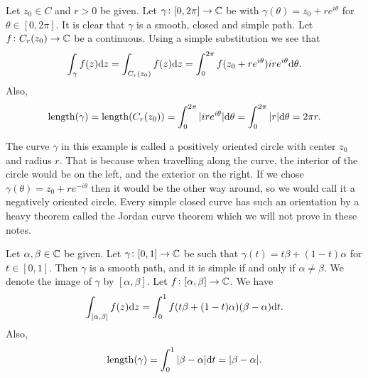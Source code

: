 \documentclass[11pt,a4paper]{article}
\begin{document}
\begin{example}
  Let $z_0 \in C$ and $r > 0$ be given.
  Let $\gamma \colon [0, 2 \pi] \to \mathbb{C}$ be with
  $\gamma(\theta) = z_0 + r e^{i \theta}$ for $\theta \in [0, 2 \pi]$.
  It is clear that $\gamma$ is a smooth, closed and simple path.
  Let $f \colon C_r(z_0) \to \mathbb{C}$ be a continuous.
  Using a simple substitution we see that
  \[
    \int_{\gamma} f(z) \mathrm{d} z =
    \int_{C_r(z_0)} f(z) \mathrm{d} z =
    \int_{0}^{2 \pi} f(z_0 + r e^{i \theta}) i r e^{i \theta} \mathrm{d} \theta.
  \]
  Also,
  \[
    \mathrm{length}(\gamma) =
    \mathrm{length}(C_r(z_0)) =
    \int_{0}^{2 \pi} |i r e^{i \theta}| \mathrm{d} \theta =
    \int_{0}^{2 \pi} |r| \mathrm{d} \theta =
    2 \pi r.
  \]
\end{example}
\begin{remark}
  The curve $\gamma$ in this example is called a positively oriented circle
  with center $z_0$ and radius $r$.
  That is because when travelling along the curve, the interior of the circle
  would be on the left, and the exterior on the right.
  If we chose $\gamma(\theta) = z_0 + r e^{- i \theta}$ then it would
  be the other way around, so we would call it a negatively oriented circle.
  Every simple closed curve has such an orientation by a heavy theorem called
  the Jordan curve theorem which we will not prove in these notes.
\end{remark}

\begin{example}
  \label{exm:integral-over-interval}
  Let $\alpha, \beta \in \mathbb{C}$ be given.
  Let $\gamma \colon [0, 1] \to \mathbb{C}$ be such that
  $\gamma(t) = t \beta + (1 - t) \alpha$ for $t \in [0,1]$.
  Then $\gamma$ is a smooth path, and it is simple if and only 
  if $\alpha \neq \beta$. We denote the image of $\gamma$ by $[\alpha,\beta]$.
  Let $f \colon [\alpha,\beta] \to \mathbb{C}$.
  We have
  \[
    \int_{[\alpha,\beta]} f(z) \mathrm{d} z =
    \int_{0}^{1} f(t \beta + (1 - t) \alpha)(\beta - \alpha) \mathrm{d} t.
  \]
  Also,
  \[
    \mathrm{length}(\gamma) = \int_{0}^{1} |\beta - \alpha| \mathrm{d} t = |\beta - \alpha|.
  \]
\end{example}
\end{document}
